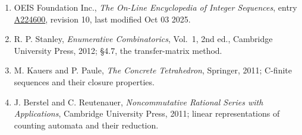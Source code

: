 \documentclass[11pt]{article}
\theoremstyle{definition}
\begin{document}
\begin{enumerate}

\item OEIS Foundation Inc., \emph{The On-Line Encyclopedia of Integer Sequences}, entry \href{https://oeis.org/A224600}{A224600}, revision 10, last modified Oct 03 2025.

\item R. P. Stanley, \emph{Enumerative Combinatorics}, Vol.~1, 2nd ed., Cambridge University Press, 2012; \S4.7, the transfer-matrix method.

\item M. Kauers and P. Paule, \emph{The Concrete Tetrahedron}, Springer, 2011; C-finite sequences and their closure properties.

\item J. Berstel and C. Reutenauer, \emph{Noncommutative Rational Series with Applications}, Cambridge University Press, 2011; linear representations of counting automata and their reduction.

\end{enumerate}
\end{document}
